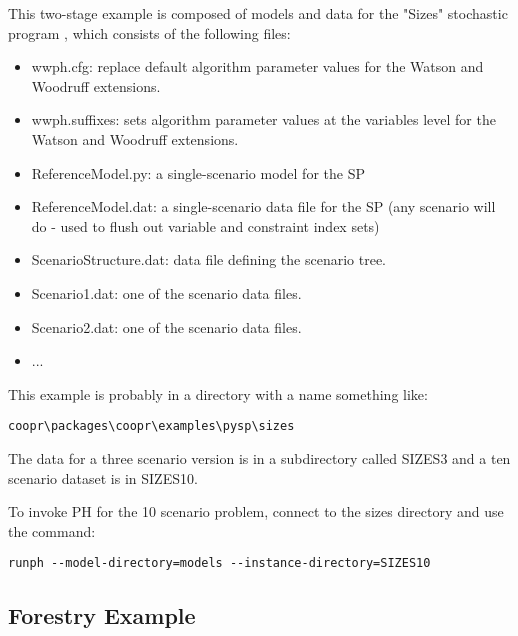 This two-stage example is composed of models and data for the "Sizes" stochastic
program \cite{sizes,lokwood}, which consists of the following files:

\begin{itemize}
  \item wwph.cfg: replace default algorithm parameter values for the Watson and
  Woodruff extensions.

  \item wwph.suffixes: sets algorithm parameter values at the variables level
  for the Watson and Woodruff extensions.

  \item ReferenceModel.py: a single-scenario model for the SP

  \item ReferenceModel.dat: a single-scenario data file for the SP (any scenario
  will do - used to flush out variable and constraint index sets)

  \item ScenarioStructure.dat: data file defining the scenario tree.

  \item Scenario1.dat: one of the scenario data files.

  \item Scenario2.dat: one of the scenario data files.

  \item ...
\end{itemize}

This example is probably in a directory with a name something like:

\begin{verbatim}
coopr\packages\coopr\examples\pysp\sizes
\end{verbatim}

The data for a three scenario version is in a subdirectory called SIZES3 and a
ten scenario dataset is in SIZES10.

To invoke PH for the 10 scenario problem, connect to the sizes directory and use
the command:

\begin{verbatim}
runph --model-directory=models --instance-directory=SIZES10
\end{verbatim}


\subsection{Forestry Example}

